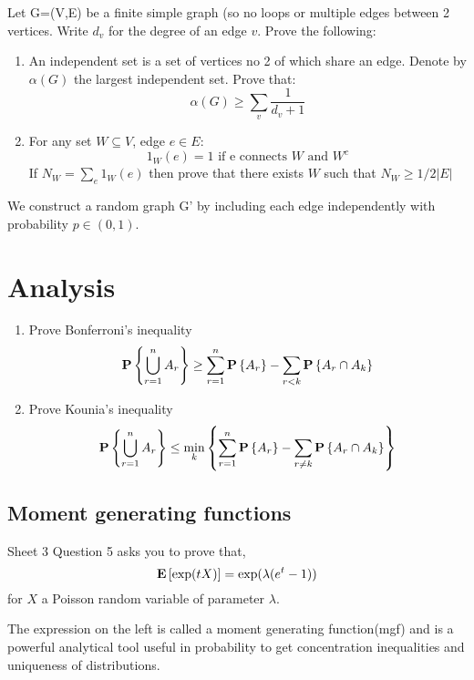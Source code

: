 \documentclass{article}
\begin{document}
Let G=(V,E) be a finite simple graph (so no loops or multiple edges between 2 vertices.
Write $d_v$ for the degree of an edge $v$.
Prove the following:
\begin{enumerate}
    \item An independent set is a set of vertices no 2 of which share an edge. Denote by $\alpha(G)$ the largest independent set. Prove that:
    \begin{equation}
        \alpha(G)\geq\sum_v\frac{1}{d_v+1}
    \end{equation}
    \item For any set $W\subseteq V$, edge $e\in E$:
    \begin{equation}
        1_W(e)=1\text{ if e connects }W \text{ and }W^c
    \end{equation}
    If $N_W=\sum_e1_W(e)$ then prove that there exists $W$ such that $N_W\geq1/2|E|$
\end{enumerate}
We construct a random graph G' by including each edge independently with probability $p\in(0,1)$.
\section{Analysis}
\begin{enumerate}
    \item Prove Bonferroni's inequality
    \begin{equation}
        {\mathbf P}\left\{\bigcup_{r=1}^nA_r\right\}\geq\sum_{r=1}^n{\mathbf P}\left\{A_r\right\}-\sum_{r<k}{\mathbf P}\left\{A_r\cap A_k\right\}
    \end{equation}
    \item Prove Kounia's inequality
    \begin{equation}
        {\mathbf P}\left\{\bigcup_{r=1}^nA_r\right\}\leq\min_k\left\{\sum_{r=1}^n{\mathbf P}\left\{A_r\right\}-\sum_{r\neq k}{\mathbf P}\left\{A_r\cap A_k\right\}\right\}
    \end{equation}
\end{enumerate}

\subsection{Moment generating functions}
Sheet 3 Question 5 asks you to prove that,
\begin{equation*}
    {\mathbf E}\left[\exp(t X)\right]=\exp(\lambda(e^t-1))
\end{equation*}
for $X$ a Poisson random variable of parameter $\lambda$.

The expression on the left is called a moment generating function(mgf) and is a powerful analytical tool useful in probability to get concentration inequalities and uniqueness of distributions.
\end{document}
